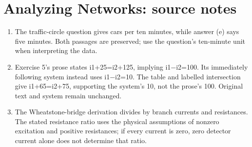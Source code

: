 \section*{Analyzing Networks: source notes}
\begin{enumerate}
\item The traffic-circle question gives cars per ten minutes, while answer (e) says five minutes. Both passages are preserved; use the question’s ten-minute unit when interpreting the data.
\item Exercise 5’s prose states i1+25=i2+125, implying i1−i2=100. Its immediately following system instead uses i1−i2=10. The table and labelled intersection give i1+65=i2+75, supporting the system’s 10, not the prose’s 100. Original text and system remain unchanged.
\item The Wheatstone-bridge derivation divides by branch currents and resistances. The stated resistance ratio uses the physical assumptions of nonzero excitation and positive resistances; if every current is zero, zero detector current alone does not determine that ratio.
\end{enumerate}
